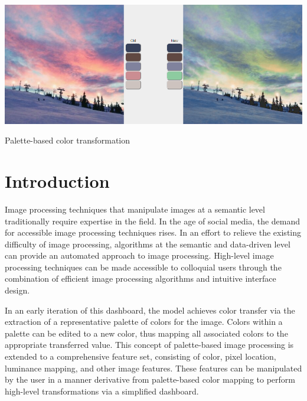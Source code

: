 \documentclass[sigchi]{acmart}
\begin{document}
%
\begin{teaserfigure}
  \includegraphics[width=\textwidth]{SkyTeaser.png}
  \caption{Palette-based color transformation}
  \label{fig:teaser}
\end{teaserfigure}

%
\maketitle

\section{Introduction}
Image processing techniques that manipulate images at a semantic level traditionally require expertise in the field. In the age of social media, the demand for accessible image processing techniques rises. In an effort to relieve the existing difficulty of image processing, algorithms at the semantic and data-driven level can provide an automated approach to image processing. High-level image processing techniques can be made accessible to colloquial users through the combination of efficient image processing algorithms and intuitive interface design.

In an early iteration of this dashboard, the model achieves color transfer via the extraction of a representative palette of colors for the image. Colors within a palette can be edited to a new color, thus mapping all associated colors to the appropriate transferred value. This concept of palette-based image processing is extended to a comprehensive feature set, consisting of color, pixel location, luminance mapping, and other image features. These features can be manipulated by the user in a manner derivative from palette-based color mapping to perform high-level transformations via a simplified dashboard.
\end{document}
